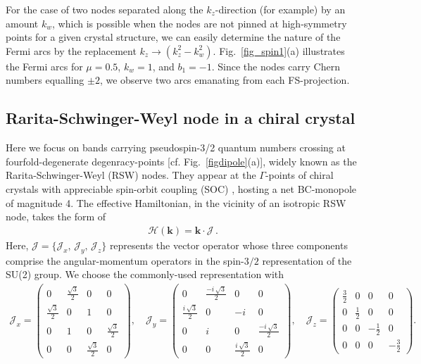 \documentclass[aps,prb,onecolumn, footinbib, 10pt]{revtex4-2}
\begin{document}
For the case of two nodes separated along the $ k_z$-direction (for example) by an amount $k_w$, which is possible when the nodes are not pinned at high-symmetry points for a given crystal structure, we can easily determine the nature of the Fermi arcs by the replacement $ k_z \rightarrow (k_z^2 - k_w^2)$. Fig.~\ref{fig_spin1}(a) illustrates the Fermi arcs for $\mu=0.5$, $k_w =1$, and $b_1=-1$. Since the nodes carry Chern numbers equalling $\pm 2$, we observe two arcs emanating from each FS-projection.


\subsection{Rarita-Schwinger-Weyl node in a chiral crystal}

Here we focus on bands carrying pseudospin-3/2 quantum numbers crossing at fourfold-degenerate degenracy-points [cf. Fig.~\ref{figdipole}(a)], widely known as the Rarita-Schwinger-Weyl (RSW) nodes. They appear at the $\Gamma$-points of chiral crystals with appreciable spin-orbit coupling (SOC) \cite{grushin-multifold, multifold-rhsi, Yao2020, ips-rsw-ph,ips-shreya,ips-internode}, hosting a net BC-monopole of magnitude 4. The effective Hamiltonian, in the vicinity of an isotropic RSW node, takes the form of
\begin{align}
\mathcal{H}(\boldsymbol{k}) =   {\boldsymbol k} \cdot \boldsymbol{\mathcal J} \,.
\end{align}
Here, $ \boldsymbol{\mathcal J } = \lbrace {\mathcal J }_x,\, {\mathcal J }_y,\, {\mathcal J }_z \rbrace $ represents the vector operator whose three components comprise the angular-momentum operators in the spin-$3/2$ representation of the SU(2) group. We choose the commonly-used representation with
\begin{align}
{\mathcal J }_x= 
\begin{pmatrix}
	0 & \frac{\sqrt{3}}{2} & 0 & 0 \\
	\frac{\sqrt{3}}{2} & 0 & 1 & 0 \\
	0 & 1 & 0 & \frac{\sqrt{3}}{2} \\
	0 & 0 & \frac{\sqrt{3}}{2} & 0 
\end{pmatrix} , \quad
{\mathcal J }_y=
\begin{pmatrix}
	0 & \frac{-i \,  \sqrt{3}}{2}  & 0 & 0 \\
	\frac{i \, \sqrt{3}}{2} & 0 & -i & 0 \\
	0 & i & 0 & \frac{-i \, \sqrt{3}}{2}  \\
	0 & 0 & \frac{i \, \sqrt{3}}{2} & 0 
\end{pmatrix}, \quad
{\mathcal J }_z =
\begin{pmatrix}
	\frac{3}{2} & 0 & 0 & 0 \\
	0 & \frac{1}{2} & 0 & 0 \\
	0 & 0 & -\frac{1}{2} & 0 \\
	0 & 0 & 0 & -\frac{3}{2} 
\end{pmatrix}.
\end{align}
\end{document}

